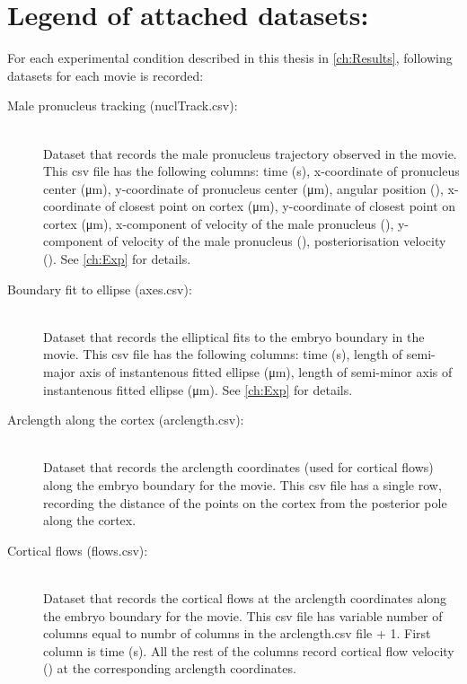 \section*{Legend of attached datasets:}
For each experimental condition described in this thesis in \autoref{ch:Results}, following datasets for each movie is recorded:
\begin{description}
\item[Male pronucleus tracking (nuclTrack.csv):]\hfill\\
Dataset that records the male pronucleus trajectory observed in the movie. This csv file has the following columns: time (\si{\second}), x-coordinate of pronucleus center (\si{\micro\meter}), y-coordinate of pronucleus center (\si{\micro\meter}), angular position (\si{\unitAngle}), x-coordinate of closest point on cortex (\si{\micro\meter}), y-coordinate of closest point on cortex (\si{\micro\meter}), x-component of velocity of the male pronucleus (\si{\unitPostVel}), y-component of velocity of the male pronucleus (\si{\unitPostVel}), posteriorisation velocity (\si{\unitPostVel}). See \autoref{ch:Exp} for details.
\item[Boundary fit to ellipse (axes.csv):]\hfill\\
Dataset that records the elliptical fits to the embryo boundary in the movie. This csv file has the following columns: time (\si{\second}), length of semi-major axis of instantenous fitted ellipse (\si{\micro\meter}), length of semi-minor axis of instantenous fitted ellipse (\si{\micro\meter}). See \autoref{ch:Exp} for details.
\item[Arclength along the cortex (arclength.csv):]\hfill\\
Dataset that records the arclength coordinates (used for cortical flows) along the embryo boundary for the movie. This csv file has a single row, recording the distance of the points on the cortex from the posterior pole along the cortex.
\item[Cortical flows (flows.csv):]\hfill\\
Dataset that records the cortical flows at the arclength coordinates along the embryo boundary for the movie. This csv file has variable number of columns equal to numbr of columns in the arclength.csv file + 1. First column is time (\si{\second}). All the rest of the columns record cortical flow velocity (\si{\unitPostVel}) at the corresponding arclength coordinates.
\end{description}